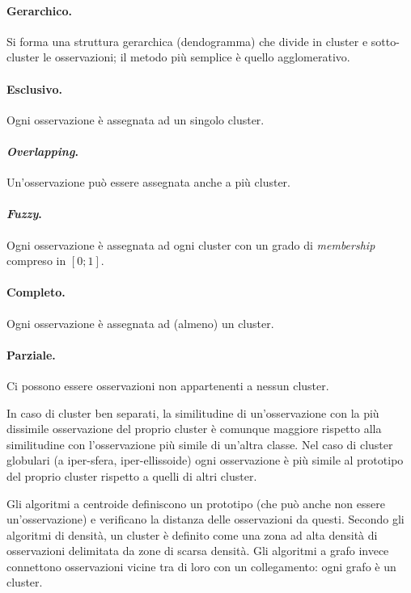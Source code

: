 \documentclass[11pt, a4page, twocolumn]{article}
\begin{document}
\paragraph{Gerarchico.}
Si forma una struttura gerarchica (dendogramma) che divide in cluster e sotto-cluster le osservazioni; il metodo più semplice è quello agglomerativo.

\paragraph{Esclusivo.}
Ogni osservazione è assegnata ad un singolo cluster.
\paragraph{\textit{Overlapping}.}
Un'osservazione può essere assegnata anche a più cluster.
\paragraph{\textit{Fuzzy}.}
Ogni osservazione è assegnata ad ogni cluster con un grado di \textit{membership} compreso in $[0;1]$.

\paragraph{Completo.}
Ogni osservazione è assegnata ad (almeno) un cluster.
\paragraph{Parziale.}
Ci possono essere osservazioni non appartenenti a nessun cluster. \newline

In caso di cluster ben separati, la similitudine di un'osservazione con la più dissimile osservazione del proprio cluster è comunque maggiore rispetto alla similitudine con l'osservazione più simile di un'altra classe.
Nel caso di cluster globulari (a iper-sfera, iper-ellissoide) ogni osservazione è più simile al prototipo del proprio cluster rispetto a quelli di altri cluster.

Gli algoritmi a centroide definiscono un prototipo (che può anche non essere un'osservazione) e verificano la distanza delle osservazioni da questi.
Secondo gli algoritmi di densità, un cluster è definito come una zona ad alta densità di osservazioni delimitata da zone di scarsa densità.
Gli algoritmi a grafo invece connettono osservazioni vicine tra di loro con un collegamento: ogni grafo è un cluster. \newline
\end{document}
